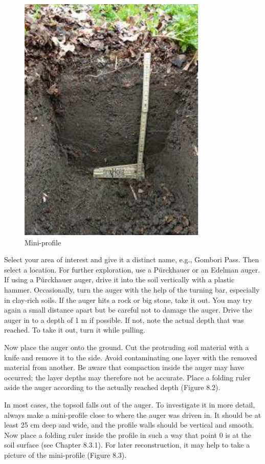 \documentclass[
  letterpaper,
  DIV=11,
  numbers=noendperiod]{scrreprt}
\begin{document}
\begin{figure}

{\centering \includegraphics{./figure_8-3.png}

}

\caption{Mini-profile}

\end{figure}

Select your area of interest and give it a distinct name, e.g., Gombori
Pass. Then select a location. For further exploration, use a Pürckhauer
or an Edelman auger. If using a Pürckhauer auger, drive it into the soil
vertically with a plastic hammer. Occasionally, turn the auger with the
help of the turning bar, especially in clay-rich soils. If the auger
hits a rock or big stone, take it out. You may try again a small
distance apart but be careful not to damage the auger. Drive the auger
in to a depth of 1 m if possible. If not, note the actual depth that was
reached. To take it out, turn it while pulling.

Now place the auger onto the ground. Cut the protruding soil material
with a knife and remove it to the side. Avoid contaminating one layer
with the removed material from another. Be aware that compaction inside
the auger may have occurred; the layer depths may therefore not be
accurate. Place a folding ruler aside the auger according to the
actually reached depth (Figure 8.2).

In most cases, the topsoil falls out of the auger. To investigate it in
more detail, always make a mini-profile close to where the auger was
driven in. It should be at least 25 cm deep and wide, and the profile
walls should be vertical and smooth. Now place a folding ruler inside
the profile in such a way that point 0 is at the soil surface (see
Chapter 8.3.1). For later reconstruction, it may help to take a picture
of the mini-profile (Figure 8.3).
\end{document}
